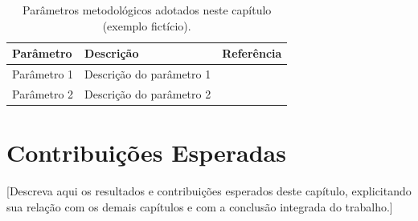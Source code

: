 \begin{table}[H]
  \centering
  \caption{Parâmetros metodológicos adotados neste capítulo (exemplo
           fictício).}
  \label{tab:cap3-exemplo}
  \begin{tabularx}{\textwidth}{lXl}
    \toprule
    \textbf{Parâmetro} & \textbf{Descrição} & \textbf{Referência} \\
    \midrule
    Parâmetro 1 & Descrição do parâmetro 1 & \cite{exemplo:web:2024} \\
    \thinrule
    Parâmetro 2 & Descrição do parâmetro 2 & \cite{exemplo:relatorio:2021} \\
    \bottomrule
  \end{tabularx}
\end{table}

\section{Contribuições Esperadas}
\label{sec:cap3-contribuicoes}

[Descreva aqui os resultados e contribuições esperados deste
capítulo, explicitando sua relação com os demais capítulos e com a
conclusão integrada do trabalho.]
